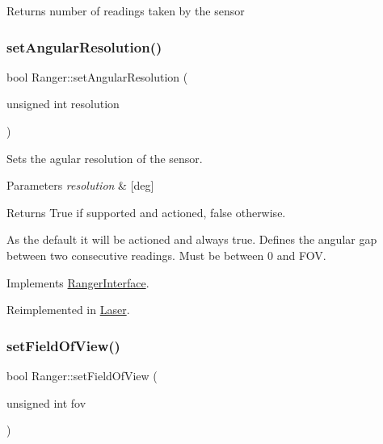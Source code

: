 \begin{DoxyReturn}{Returns}
number of readings taken by the sensor 
\end{DoxyReturn}
\mbox{\label{classRanger_a3dc62dcba54eefbd7a0f08cbf97d87dc}} 
\subsubsection{\texorpdfstring{set\+Angular\+Resolution()}{setAngularResolution()}}
{\footnotesize\ttfamily bool Ranger\+::set\+Angular\+Resolution (\begin{DoxyParamCaption}\item[{unsigned int}]{resolution }\end{DoxyParamCaption})\hspace{0.3cm}{\ttfamily [virtual]}}



Sets the agular resolution of the sensor. 


\begin{DoxyParams}{Parameters}
{\em resolution} & \mbox{[}deg\mbox{]} \\
\hline
\end{DoxyParams}
\begin{DoxyReturn}{Returns}
True if supported and actioned, false otherwise.
\end{DoxyReturn}
As the default it will be actioned and always true. Defines the angular \textquotesingle{}gap\textquotesingle{} between two consecutive readings. Must be between 0 and F\+OV. 

Implements \hyperlink{classRangerInterface_aecffc9bbb58379da741c18326b9e41db}{Ranger\+Interface}.



Reimplemented in \hyperlink{classLaser_a518ac84d4631b1550330d664e161ca0a}{Laser}.

\mbox{\label{classRanger_afb5d392ca450bcce295e61c121d09157}} 
\subsubsection{\texorpdfstring{set\+Field\+Of\+View()}{setFieldOfView()}}
{\footnotesize\ttfamily bool Ranger\+::set\+Field\+Of\+View (\begin{DoxyParamCaption}\item[{unsigned int}]{fov }\end{DoxyParamCaption})\hspace{0.3cm}{\ttfamily [virtual]}}



